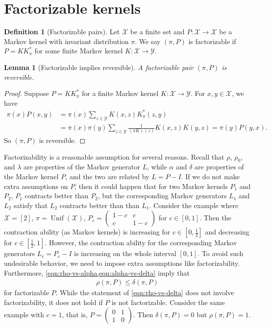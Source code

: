 \documentclass[11pt]{article}
\def\cX{\mathcal{X}}
\def\cY{\mathcal{Y}}
\DeclareMathOperator\Unif{\mathrm{Unif}}
\newtheorem{lemma}[theorem]{Lemma}
\theoremstyle{definition}
\newtheorem{definition}[theorem]{Definition}
\begin{document}
\section{Factorizable kernels} \label{sec:factor}
\begin{definition}[Factorizable pairs]
  Let $\cX$ be a finite set and $P: \cX \to \cX$ be a Markov kernel with invariant distribution $\pi$.
  We say $(\pi, P)$ is factorizable if $P=KK_\pi^*$ for some finite Markov kernel $K: \cX\to \cY$.
\end{definition}
\begin{lemma}[Factorizable implies reversible] \label{lem:factor-imply-reversible}
  A factorizable pair $(\pi, P)$ is reversible.
\end{lemma}
\begin{proof}
  Suppose $P=KK_\pi^*$ for a finite Markov kernel $K: \cX \to \cY$.
  For $x,y\in \cX$, we have
  \begin{align}
    \pi(x) P(x,y) &= \pi(x) \sum_{z\in \cY} K(x,z) K_\pi^*(z,y) \\
    \nonumber &= \pi(x) \pi(y) \sum_{z\in \cY} \frac 1{(\pi K)(z)} K(x,z) K(y,z)
    = \pi(y) P(y,x).
  \end{align}
  So $(\pi, P)$ is reversible.
\end{proof}

Factorizability is a reasonable assumption for several reasons. Recall that $\rho$, $\rho_0$, and $\lambda$ are properties of the Markov generator $L$, while $\alpha$ and $\delta$ are properties of the Markov kernel $P$, and the two are related by $L=P-I$. If we do not make extra assumptions on $P$, then it could happen that for two Markov kernels $P_1$ and $P_2$, $P_1$ contracts better than $P_2$, but the corresponding Markov generators $L_1$ and $L_2$ satisfy that $L_2$ contracts better than than $L_1$.
Consider the example where $\cX=[2]$, $\pi = \Unif(\cX)$, $P_c = \begin{pmatrix}
  1-c & c \\
  c & 1-c
\end{pmatrix}$ for $c\in [0, 1]$.
Then the contraction ability (as Markov kernels) is increasing for $c\in \left[0,\frac 12\right]$ and decreasing for $c\in \left[\frac 12, 1\right]$.
However, the contraction ability for the corresponding Markov generators $L_c=P_c-I$ is increasing on the whole interval $[0, 1]$.
To avoid such undesirable behavior, we need to impose extra assumptions like factorizability.
Furthermore, \cref{eqn:rho-vs-alpha,eqn:alpha-vs-delta} imply that
\begin{align} \label{eqn:rho-vs-delta}
  \rho(\pi, P) \le \delta(\pi, P)
\end{align}
for factorizable $P$. While the statement of \cref{eqn:rho-vs-delta} does not involve factorizability, it does not hold if $P$ is not factorizable.
Consider the same example with $c=1$, that is, $P=\begin{pmatrix}
  0 & 1 \\ 1 & 0
\end{pmatrix}$.
Then $\delta(\pi, P)=0$ but $\rho(\pi, P) = 1$.
\end{document}
